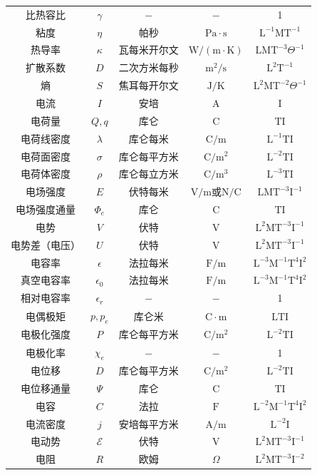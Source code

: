 \begin{center}
\begin{tabular}{ccccc}
        比热容比&$\gamma$&$\mathrm{-}$&$\mathrm{-}$&1\\
        粘度&$\eta$&帕秒&$\mathrm{Pa\cdot s}$&$\mathrm{L^{-1}MT^{-1}}$\\
        热导率&$\kappa$&瓦每米开尔文&$\mathrm{W/(m\cdot K)}$&$\mathrm{LMT^{-3}}\Theta^{-1}$\\
        扩散系数&$D$&二次方米每秒&$\mathrm{m^2/s}$&$\mathrm{L^2T^{-1}}$\\
        熵&$S$&焦耳每开尔文&$\mathrm{J/K}$&$\mathrm{L^2MT^{-2}}\Theta^{-1}$\\
        电流&$I$&安培&$\mathrm{A}$&$\mathrm{I}$\\
        电荷量&$Q,q$&库仑&$\mathrm{C}$&$\mathrm{TI}$\\
        电荷线密度&$\lambda$&库仑每米&$\mathrm{C/m}$&$\mathrm{L^{-1}TI}$\\
        电荷面密度&$\sigma$&库仑每平方米&$\mathrm{C/m^2}$&$\mathrm{L^{-2}TI}$\\
        电荷体密度&$\rho$&库仑每立方米&$\mathrm{C/m^3}$&$\mathrm{L^{-3}TI}$\\
        电场强度&$E$&伏特每米&$\mathrm{V/m\text{或}N/C}$&$\mathrm{LMT^{-3}I^{-1}}$\\
        电场强度通量&$\Phi_e$&库仑&$\mathrm{C}$&$\mathrm{TI}$\\
        电势&$V$&伏特&$\mathrm{V}$&$\mathrm{L^2MT^{-3}I^{-1}}$\\
        电势差（电压）&$U$&伏特&$\mathrm{V}$&$\mathrm{L^2MT^{-3}I^{-1}}$\\
        电容率&$\epsilon$&法拉每米&$\mathrm{F/m}$&$\mathrm{L^{-3}M^{-1}T^4I^2}$\\

        真空电容率&$\epsilon_0$&法拉每米&$\mathrm{F/m}$&$\mathrm{L^{-3}M^{-1}T^4I^2}$\\
        相对电容率&$\epsilon_r$&$\mathrm{-}$&$\mathrm{-}$&1\\
        电偶极矩&$p,p_e$&库仑米&$\mathrm{C\cdot m}$&$\mathrm{LTI}$\\
        电极化强度&$P$&库仑每平方米&$\mathrm{C/m^2}$&$\mathrm{L^{-2}TI}$\\
        电极化率&$\chi_e$&$\mathrm{-}$&$\mathrm{-}$&1\\
        电位移&$D$&库仑每平方米&$\mathrm{C/m^2}$&$\mathrm{L^{-2}TI}$\\
        电位移通量&$\Psi$&库仑&$\mathrm{C}$&$\mathrm{TI}$\\
        电容&$C$&法拉&$\mathrm{F}$&$\mathrm{L^{-2}M^{-1}T^{4}I^2}$\\
        电流密度&$j$&安培每平方米&$\mathrm{A/m}$&$\mathrm{L^{-2}I}$\\
        电动势&$\mathscr{E}$&伏特&$\mathrm{V}$&$\mathrm{L^2MT^{-3}I^{-1}}$\\
        电阻&$R$&欧姆&$\Omega$&$\mathrm{L^2MT^{-3}I^{-2}}$\\
        

\end{tabular}
\end{center}
